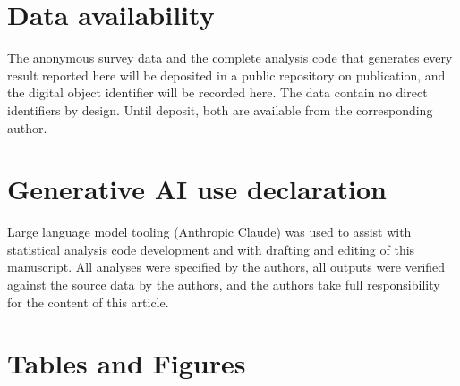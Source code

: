 \documentclass[12pt]{article}
\begin{document}
\section*{Data availability}
The anonymous survey data and the complete analysis code that generates every result reported here will
be deposited in a public repository on publication, and the digital object identifier will be recorded
here. The data contain no direct identifiers by design. Until deposit, both are available from the
corresponding author.

\section*{Generative AI use declaration}
Large language model tooling (Anthropic Claude) was used to assist with statistical analysis code
development and with drafting and editing of this manuscript. All analyses were specified by the authors,
all outputs were verified against the source data by the authors, and the authors take full responsibility
for the content of this article.



\clearpage

\section*{Tables and Figures}
\end{document}
